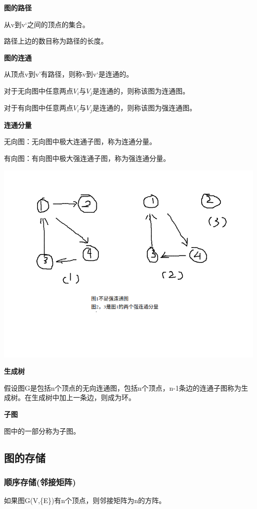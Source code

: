 \documentclass{article}
\begin{document}
		\textbf{图的路径}

		从v到v‘之间的顶点的集合。

		路径上边的数目称为路径的长度。

		\textbf{图的连通}

		从顶点v到v’有路径，则称v到v‘是连通的。

		对于无向图中任意两点$V_i$与$V_j$是连通的，则称该图为连通图。

		对于有向图中任意两点$V_i$与$V_j$是连通的，则称该图为强连通图。

		\textbf{连通分量}

		无向图：无向图中极大连通子图，称为连通分量。

		有向图：有向图中极大强连通子图，称为强连通分量。

		\includegraphics[scale=0.4]{./pic/graph-01.png}

		\textbf{生成树}

		假设图G是包括n个顶点的无向连通图，包括n个顶点，n-1条边的连通子图称为生成树。在生成树中加上一条边，则成为环。

		\textbf{子图}

		图中的一部分称为子图。

	\subsection{图的存储}
	\subsubsection{顺序存储(邻接矩阵)}
		如果图G(V,\{E\})有n个顶点，则邻接矩阵为n的方阵。
\end{document}
